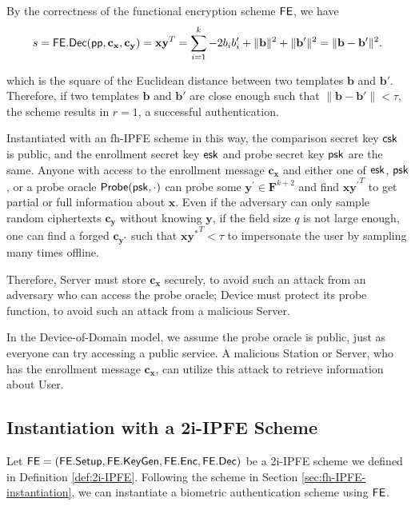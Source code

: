 By the correctness of the functional encryption scheme $\sf FE$, we have
\[
	s = {\sf FE.Dec}({\sf pp}, \mathbf{c_x}, \mathbf{c_y}) =  \mathbf{x} \mathbf{y}^T = \sum_{i=1}^k -2b_ib_i' + \|\mathbf{b}\|^2 + \|\mathbf{b'}\|^2 = \| \mathbf{b} - \mathbf{b'} \|^2.
\]

which is the square of the Euclidean distance between two templates $\mathbf{b}$ and $\mathbf{b}'$. Therefore, if two templates $\mathbf{b}$ and $\mathbf{b}'$ are close enough such that $\|\mathbf{b} - \mathbf{b'}\| < \tau$, the scheme results in $r = 1$, a successful authentication.


Instantiated with an fh-IPFE scheme in this way, the comparison secret key ${\sf csk}$ is public, and the enrollment secret key ${\sf esk}$ and probe secret key ${\sf psk}$ are the same. Anyone with access to the enrollment message $\mathbf{c_x}$ and either one of ${\sf esk}$, ${\sf psk}$, or a probe oracle ${\sf Probe}({\sf psk}, \cdot )$ can probe some $\mathbf{y}^{\prime} \in \mathbf{F}^{k+2}$ and find $\mathbf{x} {\mathbf{y}^\prime}^T$ to get partial or full information about $\mathbf{x}$. Even if the adversary can only sample random ciphertexts $\mathbf{c_{y}}$ without knowing $\mathbf{y}$, if the field size $q$ is not large enough, one can find a forged $\mathbf{c_{y^*}}$ such that $\mathbf{x}\mathbf{y^*}^T < \tau$ to impersonate the user by sampling many times offline.

Therefore, {\sf Server} must store $\mathbf{c_x}$ securely, to avoid such an attack from an adversary who can access the probe oracle; {\sf Device} must protect its probe function, to avoid such an attack from a malicious {\sf Server}. 

In the Device-of-Domain model, we assume the probe oracle is public, just as everyone can try accessing a public service. A malicious {\sf Station} or {\sf Server}, who has the enrollment message $\mathbf{c_x}$, can utilize this attack to retrieve information about {\sf User}.




\subsection{Instantiation with a 2i-IPFE Scheme}
\label{sec:2i-IPFE-instantiation}

Let ${\sf FE} = ({\sf FE.Setup}, {\sf FE.KeyGen}, {\sf FE.Enc}, {\sf FE.Dec})$ be a 2i-IPFE scheme we defined in Definition \ref{def:2i-IPFE}. Following the scheme in Section \ref{sec:fh-IPFE-instantiation}, we can instantiate a biometric authentication scheme using ${\sf FE}$.

